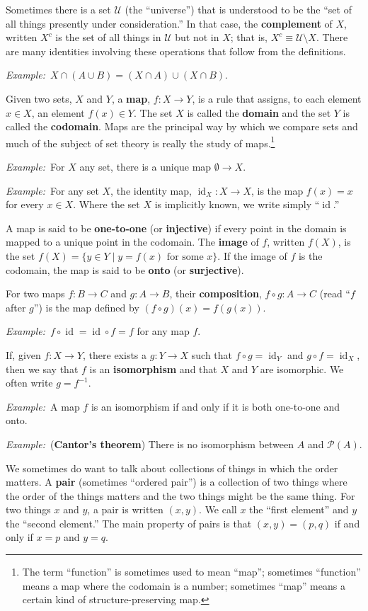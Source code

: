 \documentclass[10pt, a4paper, twocolumn]{article}
\newcommand{\defn}[1]{\textbf{\textsf{#1}}}
\newcommand{\eg}{\emph{Example:}\relax}
\DeclareMathOperator{\id}{id}
\begin{document}
Sometimes there is a set $\mathcal{U}$ (the ``universe'') that is understood to
be the “set of all things presently under consideration.” In that
case, the \defn{complement} of $X$, written $X^c$ is the set of all
things in $\mathcal{U}$ but not in $X$; that is, $X^c \equiv \mathcal{U} \setminus X$. There are many
identities involving these operations that follow from the
definitions.

\eg\ $X\cap(A\cup B) = (X\cap A)\cup (X\cap B)$.

Given two sets, $X$ and $Y$, a \defn{map}, $f : X \to Y$, is a rule that
assigns, to each element $x \in X$, an element $f(x) \in Y$. The set $X$
is called the \defn{domain} and the set $Y$ is called the
\defn{codomain}. Maps are the principal way by which we compare sets
and much of the subject of set theory is really the study of
maps.\footnote{The term “function” is sometimes used to mean “map”;
sometimes “function” means a map where the codomain is a number;
sometimes “map” means a certain kind of structure-preserving map.}

\eg\ For $X$ any set, there is a unique map $\emptyset \to X$.

\eg\ For any set $X$, the identity map, $\id_X : X \to X$, is the map
$f(x) = x$ for every $x\in X$. Where the set $X$ is implicitly known, we
write simply “$\id$.”

A map is said to be \defn{one-to-one} (or \defn{injective}) if every
point in the domain is mapped to a unique point in the codomain. The
\defn{image} of $f$, written $f(X)$, is the set $f(X) = \{y \in Y \mid
\text{$y = f(x)$ for some $x$}\}$. If the image of $f$ is the
codomain, the map is said to be \defn{onto} (or \defn{surjective}).

For two maps $f:B \to C$ and $g:A \to B$, their \defn{composition}, $f\circ g: A \to C$
(read “$f$ after $g$”) is the map defined by $(f\circ g)(x) = f(g(x))$.

\eg\ $f\circ\id = \id\circ f = f$ for any map $f$. 

If, given $f:X \to Y$, there exists a $g:Y \to X$ such that $f\circ g = \id_Y$ and $g\circ f
= \id_X$, then we say that $f$ is an \defn{isomorphism} and that $X$ and $Y$ are
isomorphic. We often write $g = f^{-1}$.

\eg\ A map $f$ is an isomorphism if and only if it is both one-to-one and onto. 

\eg\ (\defn{Cantor's theorem}) There is no isomorphism between $A$ and $\mathcal{P}(A)$. 

We sometimes do want to talk about collections of things in which the
order matters. A \defn{pair} (sometimes “ordered pair”) is a
collection of two things where the order of the things matters and the
two things might be the same thing. For two things $x$ and $y$, a pair
is written $(x, y)$. We call $x$ the “first element” and $y$ the
“second element.” The main property of pairs is that $(x,y)=(p,q)$ if
and only if $x=p$ and $y=q$.
\end{document}
